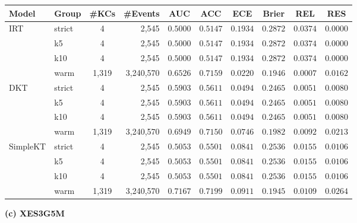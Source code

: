 \begin{tableorg}[htbp]
\begin{tabular}{llcrcccccc}
\toprule
Model & Group & \#KCs & \#Events & AUC & ACC & ECE & Brier & REL & RES \\
\midrule
IRT & strict & 4 & 2,545 & $0.5000$ & $0.5147$ & $0.1934$ & $0.2872$ & $0.0374$ & $0.0000$ \\
 & k5 & 4 & 2,545 & $0.5000$ & $0.5147$ & $0.1934$ & $0.2872$ & $0.0374$ & $0.0000$ \\
 & k10 & 4 & 2,545 & $0.5000$ & $0.5147$ & $0.1934$ & $0.2872$ & $0.0374$ & $0.0000$ \\
 & warm & 1,319 & 3,240,570 & $0.6526$ & $0.7159$ & $0.0220$ & $0.1946$ & $0.0007$ & $0.0162$ \\
\midrule
DKT & strict & 4 & 2,545 & $0.5903$ & $0.5611$ & $0.0494$ & $0.2465$ & $0.0051$ & $0.0080$ \\
 & k5 & 4 & 2,545 & $0.5903$ & $0.5611$ & $0.0494$ & $0.2465$ & $0.0051$ & $0.0080$ \\
 & k10 & 4 & 2,545 & $0.5903$ & $0.5611$ & $0.0494$ & $0.2465$ & $0.0051$ & $0.0080$ \\
 & warm & 1,319 & 3,240,570 & $0.6949$ & $0.7150$ & $0.0746$ & $0.1982$ & $0.0092$ & $0.0213$ \\
\midrule
SimpleKT & strict & 4 & 2,545 & $0.5053$ & $0.5501$ & $0.0841$ & $0.2536$ & $0.0155$ & $0.0106$ \\
 & k5 & 4 & 2,545 & $0.5053$ & $0.5501$ & $0.0841$ & $0.2536$ & $0.0155$ & $0.0106$ \\
 & k10 & 4 & 2,545 & $0.5053$ & $0.5501$ & $0.0841$ & $0.2536$ & $0.0155$ & $0.0106$ \\
 & warm & 1,319 & 3,240,570 & $0.7167$ & $0.7199$ & $0.0911$ & $0.1945$ & $0.0109$ & $0.0264$ \\
\bottomrule
\end{tabular}

\vspace{3ex}
\textbf{(c) XES3G5M}
\vspace{1ex}


\end{tableorg}
